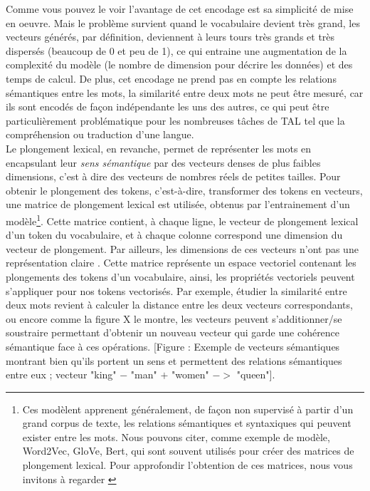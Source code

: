\documentclass[12pt, french, twoside]{report}
\begin{document}
Comme vous pouvez le voir l'avantage de cet encodage est sa simplicité de mise en oeuvre. Mais le problème survient quand le vocabulaire devient très grand, les vecteurs générés, par définition, deviennent à leurs tours très grands et très dispersés (beaucoup de 0 et peu de 1), ce qui entraine une augmentation de la complexité du modèle (le nombre de dimension pour décrire les données) et des temps de calcul. De plus, cet encodage ne prend pas en compte les relations sémantiques entre les mots, la similarité entre deux mots ne peut être mesuré,  car ils sont encodés de façon indépendante les uns des autres, ce qui peut être particulièrement problématique pour les nombreuses tâches de TAL tel que la compréhension ou traduction d'une langue.\\

Le plongement lexical, en revanche, permet de représenter les mots en encapsulant leur \textit{sens sémantique} par des vecteurs denses de plus faibles dimensions, c'est à dire des vecteurs de nombres réels de petites tailles. Pour obtenir le plongement des tokens, c'est-à-dire, transformer des tokens en vecteurs, une matrice de plongement lexical est utilisée, obtenus par l'entrainement d'un modèle\footnote{Ces modèlent apprenent généralement, de façon non supervisé à partir d'un grand corpus de texte, les relations sémantiques et syntaxiques qui peuvent exister entre les mots. Nous pouvons citer, comme exemple de modèle, Word2Vec, GloVe, Bert, qui sont souvent utilisés pour créer des matrices de plongement lexical. Pour approfondir l'obtention de ces matrices, nous vous invitons à regarder \cite{jurafsky_vector}\cite{jurafsky_ffnn}\cite{jurafsky_11}}. Cette matrice contient, à chaque ligne, le vecteur de plongement lexical d'un token du vocabulaire, et à chaque colonne correspond une dimension du vecteur de plongement. Par ailleurs, les dimensions de ces vecteurs n'ont pas une représentation claire \cite{jurafsky_vector}. Cette matrice représente un espace vectoriel contenant les plongements des tokens d'un vocabulaire, ainsi, les propriétés vectoriels peuvent s'appliquer pour nos tokens vectorisés. Par exemple, étudier la similarité entre deux mots revient à calculer la distance entre les deux vecteurs correspondants, ou encore comme la figure X le montre, les vecteurs peuvent s'additionner/se soustraire permettant d'obtenir un nouveau vecteur qui garde une cohérence sémantique face à ces opérations. [Figure : Exemple de vecteurs sémantiques montrant bien qu'ils portent un sens et permettent des relations sémantiques entre eux ; vecteur "king" $-$ "man" $+$ "women" $->$ "queen"].
\end{document}
